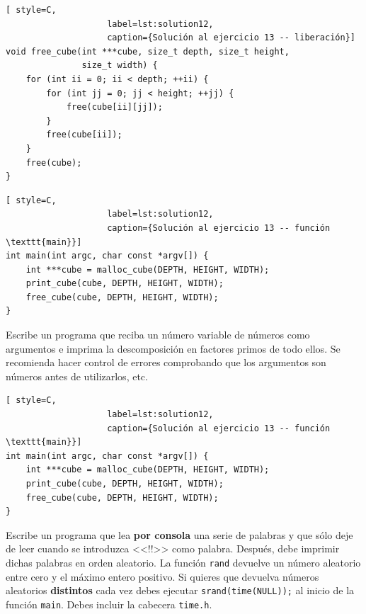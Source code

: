 \documentclass[a4paper]{article}
\begin{document}
\begin{exercises}
\noindent
\begin{minipage}[H]{\linewidth}
\mbox{}
\begin{lstlisting}[ style=C,
                    label=lst:solution12,
                    caption={Solución al ejercicio 13 -- liberación}]
void free_cube(int ***cube, size_t depth, size_t height,
               size_t width) {
    for (int ii = 0; ii < depth; ++ii) {
        for (int jj = 0; jj < height; ++jj) {
            free(cube[ii][jj]);
        }
        free(cube[ii]);
    }
    free(cube);
}
\end{lstlisting}
\end{minipage}

\noindent
\begin{minipage}[H]{\linewidth}
\mbox{}
\begin{lstlisting}[ style=C,
                    label=lst:solution12,
                    caption={Solución al ejercicio 13 -- función \texttt{main}}]
int main(int argc, char const *argv[]) {
    int ***cube = malloc_cube(DEPTH, HEIGHT, WIDTH);
    print_cube(cube, DEPTH, HEIGHT, WIDTH);
    free_cube(cube, DEPTH, HEIGHT, WIDTH);
}
\end{lstlisting}
\end{minipage}

\item Escribe un programa que reciba un número variable de números como
argumentos e imprima la descomposición en factores primos de todo ellos.
Se recomienda hacer control de errores comprobando que los argumentos son
números antes de utilizarlos, etc.

\noindent
\begin{minipage}[H]{\linewidth}
\mbox{}
\begin{lstlisting}[ style=C,
                    label=lst:solution12,
                    caption={Solución al ejercicio 13 -- función \texttt{main}}]
int main(int argc, char const *argv[]) {
    int ***cube = malloc_cube(DEPTH, HEIGHT, WIDTH);
    print_cube(cube, DEPTH, HEIGHT, WIDTH);
    free_cube(cube, DEPTH, HEIGHT, WIDTH);
}
\end{lstlisting}
\end{minipage}

\item Escribe un programa que lea \textbf{por consola} una serie de palabras
y que sólo deje de leer cuando se introduzca <<!!>> como palabra. Después, debe
imprimir dichas palabras en orden aleatorio. La función \verb!rand! devuelve
un número aleatorio entre cero y el máximo entero positivo. Si quieres que
devuelva números aleatorios \textbf{distintos} cada vez debes ejecutar
\verb!srand(time(NULL));! al inicio de la función \verb!main!. Debes incluir la
cabecera \verb!time.h!.


\end{exercises}
\end{document}
